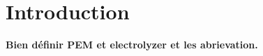 \section{Introduction}

\lipsum[1]
\lipsum[2]
\lipsum[3]
\textbf{Bien définir PEM et electrolyzer et les abrievation.}\\